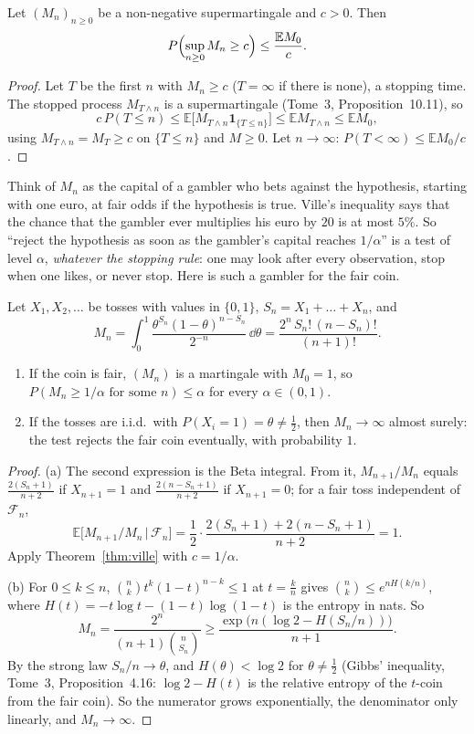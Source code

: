 \begin{theorem}\label{thm:ville}
Let $(M_n)_{n\ge0}$ be a non-negative supermartingale and $c>0$. Then
\[
P\Bigl(\sup_{n\ge0}M_n\ge c\Bigr)\le\frac{\mathbb EM_0}c.
\]
\end{theorem}
\begin{proof}
Let $T$ be the first $n$ with $M_n\ge c$ ($T=\infty$ if there is none), a stopping time. The stopped process $M_{T\wedge n}$ is a supermartingale (Tome~3, Proposition~10.11), so
\[
c\,P(T\le n)\le\mathbb E\bigl[M_{T\wedge n}\mathbf 1_{\{T\le n\}}\bigr]\le\mathbb EM_{T\wedge n}\le\mathbb EM_0,
\]
using $M_{T\wedge n}=M_T\ge c$ on $\{T\le n\}$ and $M\ge0$. Let $n\to\infty$: $P(T<\infty)\le\mathbb EM_0/c$.
\end{proof}

Think of $M_n$ as the capital of a gambler who bets against the hypothesis, starting with one euro, at fair odds if the hypothesis is true. Ville's inequality says that the chance that the
gambler ever multiplies his euro by $20$ is at most $5\%$. So ``reject the hypothesis as soon as the gambler's capital reaches $1/\alpha$'' is a test of level $\alpha$, \emph{whatever the stopping rule}: one may look
after every observation, stop when one likes, or never stop. Here is such a gambler for the fair coin.

\begin{theorem}\label{thm:anytime}
Let $X_1,X_2,\dots$ be tosses with values in $\{0,1\}$, $S_n=X_1+\dots+X_n$, and
\[
M_n=\int_0^1\frac{\theta^{S_n}(1-\theta)^{n-S_n}}{2^{-n}}\,\dd\theta=\frac{2^n\,S_n!\,(n-S_n)!}{(n+1)!}.
\]
\begin{enumerate}[label=(\alph*)]
\item If the coin is fair, $(M_n)$ is a martingale with $M_0=1$, so $P(M_n\ge1/\alpha\text{ for some }n)\le\alpha$ for every $\alpha\in(0,1)$.
\item If the tosses are i.i.d.\ with $P(X_i=1)=\theta\neq\frac12$, then $M_n\to\infty$ almost surely: the test rejects the fair coin eventually, with probability $1$.
\end{enumerate}
\end{theorem}
\begin{proof}
(a) The second expression is the Beta integral. From it, $M_{n+1}/M_n$ equals $\frac{2(S_n+1)}{n+2}$ if $X_{n+1}=1$ and $\frac{2(n-S_n+1)}{n+2}$ if $X_{n+1}=0$; for a fair toss independent of $\mathcal F_n$,
\[
\mathbb E\bigl[M_{n+1}/M_n\,\big|\,\mathcal F_n\bigr]=\frac12\cdot\frac{2(S_n+1)+2(n-S_n+1)}{n+2}=1.
\]
Apply Theorem~\ref{thm:ville} with $c=1/\alpha$.

(b) For $0\le k\le n$, $\binom nkt^k(1-t)^{n-k}\le1$ at $t=\frac kn$ gives $\binom nk\le e^{nH(k/n)}$, where $H(t)=-t\log t-(1-t)\log(1-t)$ is the entropy in nats. So
\[
M_n=\frac{2^n}{(n+1)\binom n{S_n}}\ge\frac{\exp\bigl(n(\log2-H(S_n/n))\bigr)}{n+1}.
\]
By the strong law $S_n/n\to\theta$, and $H(\theta)<\log2$ for $\theta\neq\frac12$ (Gibbs' inequality, Tome~3, Proposition~4.16: $\log2-H(t)$ is the relative entropy of the $t$-coin from the fair coin). So the numerator grows exponentially, the denominator only linearly,
and $M_n\to\infty$.
\end{proof}

